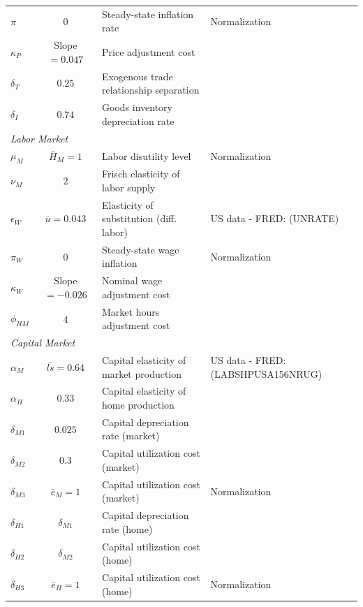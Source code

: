 \documentclass[12pt,3p,authoryear,review]{elsarticle}
\begin{document}
\begin{small}
\begin{table}[h!]
\begin{center}
\begin{scriptsize}
\begin{tabular}{l c l l}
		$\pi$ & $0$ & Steady-state inflation rate & Normalization\\%
		$\kappa_P$ & Slope $= 0.047$ & Price adjustment cost & \cite{galiInflationDynamicsStructural1999}\\%
		$\delta_T$ & $0.25$ & Exogenous trade relationship separation & \cite{mathaSearchProductMarket2011}\\%
		$\delta_I$ & $0.74$ & Goods inventory depreciation rate & \cite{khanInventoriesBusinessCycle2007}\\%
		\hline%
		\multicolumn{4}{l}{\textit{Labor Market}}\\%
		$\mu_M$ & $\bar{H}_M = 1$ & Labor disutility level & Normalization\\%
		$\nu_M$ & $2$ & Frisch elasticity of labor supply & \cite{heathcoteMacroeconomicImplicationsRising2010}\\%
		$\epsilon_W$ & $\bar{u}=0.043$ & Elasticity of substitution (diff. labor) & US data - FRED: (UNRATE)\\%
		$\pi_W$ & $0$ & Steady-state wage inflation & Normalization\\%
		$\kappa_W$ & Slope $= -0.026$ & Nominal wage adjustment cost & \cite{galiHasUSWage2019}\\%
		$\phi_{HM}$ & $4$ & Market hours adjustment cost & \cite{lechthalerQuadraticLaborAdjustment2013}\\%
		\hline%
		\multicolumn{4}{l}{\textit{Capital Market}}\\%
		$\alpha_M$ & $\bar{ls} = 0.64$ & Capital elasticity of market production & US data - FRED: (LABSHPUSA156NRUG)\\%
		$\alpha_H$ & $0.33$ & Capital elasticity of home production & \cite{gnocchiHouseworkFiscalExpansions2016}\\%
		$\delta_{M1}$ & $0.025$ & Capital depreciation rate (market) & \cite{christianoDSGEModelsMonetary2010}\\%
		$\delta_{M2}$ & $0.3$ & Capital utilization cost (market) & \cite{christianoDSGEModelsMonetary2010}\\%
		$\delta_{M3}$ & $\bar{e}_M = 1$ & Capital utilization cost (market) & Normalization\\%
		$\delta_{H1}$ & $\delta_{M1}$ & Capital depreciation rate (home) & \cite{gnocchiHouseworkFiscalExpansions2016}\\%
		$\delta_{H2}$ & $\delta_{M2}$ & Capital utilization cost (home) & \cite{gnocchiHouseworkFiscalExpansions2016}\\%
		$\delta_{H3}$ & $\bar{e}_H = 1$ & Capital utilization cost (home) & Normalization\\%

\end{tabular}
\end{scriptsize}
\end{center}
\end{table}
\end{small}
\end{document}
